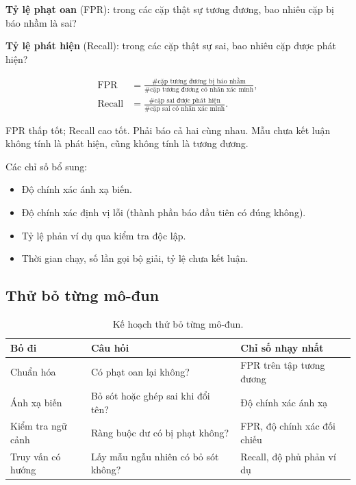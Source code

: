 \documentclass[11pt,a4paper]{article}
\theoremstyle{plain}
\theoremstyle{definition}
\theoremstyle{remark}
\begin{document}
\textbf{Tỷ lệ phạt oan} (FPR): trong các cặp thật sự tương đương,
bao nhiêu cặp bị báo nhầm là sai?

\textbf{Tỷ lệ phát hiện} (Recall): trong các cặp thật sự sai,
bao nhiêu cặp được phát hiện?

\[
\begin{aligned}
 \mathrm{FPR}
   &= \frac{\#\text{cặp tương đương bị báo nhầm}}
           {\#\text{cặp tương đương có nhãn xác minh}}, \\[0.5em]
 \mathrm{Recall}
   &= \frac{\#\text{cặp sai được phát hiện}}
           {\#\text{cặp sai có nhãn xác minh}}.
\end{aligned}
\]

FPR thấp tốt; Recall cao tốt. Phải báo cả hai cùng nhau.
Mẫu chưa kết luận không tính là phát hiện, cũng không tính là tương đương.

Các chỉ số bổ sung:
\begin{itemize}
  \item Độ chính xác ánh xạ biến.
  \item Độ chính xác định vị lỗi (thành phần báo đầu tiên có đúng không).
  \item Tỷ lệ phản ví dụ qua kiểm tra độc lập.
  \item Thời gian chạy, số lần gọi bộ giải, tỷ lệ chưa kết luận.
\end{itemize}

\subsection{Thử bỏ từng mô-đun}

\begin{table}[H]
\centering
\caption{Kế hoạch thử bỏ từng mô-đun.}
\label{tab:ablation}
\small
\begin{tabularx}{\textwidth}{L{3.5cm} Y Y}
\toprule
\textbf{Bỏ đi} & \textbf{Câu hỏi} & \textbf{Chỉ số nhạy nhất} \\
\midrule
Chuẩn hóa & Có phạt oan lại không? & FPR trên tập tương đương \\
Ánh xạ biến & Bỏ sót hoặc ghép sai khi đổi tên? & Độ chính xác ánh xạ \\
Kiểm tra ngữ cảnh & Ràng buộc dư có bị phạt không? & FPR, độ chính xác đối chiếu \\
Truy vấn có hướng & Lấy mẫu ngẫu nhiên có bỏ sót không? & Recall, độ phủ phản ví dụ \\
\bottomrule
\end{tabularx}
\end{table}
\end{document}

